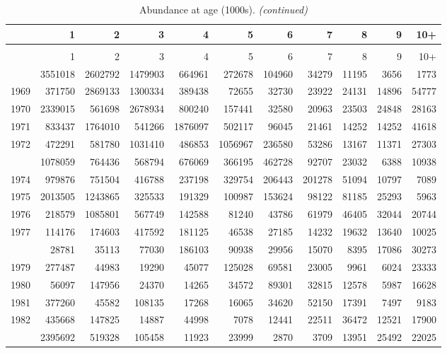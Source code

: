 \documentclass[
]{article}
\begin{document}
\begin{longtable}[t]{lrrrrrrrrrr}
\caption{\label{tab:NAA-table}Abundance at age (1000s).}\\
\toprule
  & 1 & 2 & 3 & 4 & 5 & 6 & 7 & 8 & 9 & 10+\\
\midrule
\endfirsthead
\caption[]{Abundance at age (1000s). \textit{(continued)}}\\
\toprule
  & 1 & 2 & 3 & 4 & 5 & 6 & 7 & 8 & 9 & 10+\\
\midrule
\endhead

\endfoot
\bottomrule
\endlastfoot
1968 & 3551018 & 2602792 & 1479903 & 664961 & 272678 & 104960 & 34279 & 11195 & 3656 & 1773\\
1969 & 371750 & 2869133 & 1300334 & 389438 & 72655 & 32730 & 23922 & 24131 & 14896 & 54777\\
1970 & 2339015 & 561698 & 2678934 & 800240 & 157441 & 32580 & 20963 & 23503 & 24848 & 28163\\
1971 & 833437 & 1764010 & 541266 & 1876097 & 502117 & 96045 & 21461 & 14252 & 14252 & 41618\\
1972 & 472291 & 581780 & 1031410 & 486853 & 1056967 & 236580 & 53286 & 13167 & 11371 & 27303\\
\addlinespace
1973 & 1078059 & 764436 & 568794 & 676069 & 366195 & 462728 & 92707 & 23032 & 6388 & 10938\\
1974 & 979876 & 751504 & 416788 & 237198 & 329754 & 206443 & 201278 & 51094 & 10797 & 7089\\
1975 & 2013505 & 1243865 & 325533 & 191329 & 100987 & 153624 & 98122 & 81185 & 25293 & 5963\\
1976 & 218579 & 1085801 & 567749 & 142588 & 81240 & 43786 & 61979 & 46405 & 32044 & 20744\\
1977 & 114176 & 174603 & 417592 & 181125 & 46538 & 27185 & 14232 & 19632 & 13640 & 10025\\
\addlinespace
1978 & 28781 & 35113 & 77030 & 186103 & 90938 & 29956 & 15070 & 8395 & 17086 & 30273\\
1979 & 277487 & 44983 & 19290 & 45077 & 125028 & 69581 & 23005 & 9961 & 6024 & 23333\\
1980 & 56097 & 147956 & 24370 & 14265 & 34572 & 89301 & 32815 & 12578 & 5987 & 16628\\
1981 & 377260 & 45582 & 108135 & 17268 & 16065 & 34620 & 52150 & 17391 & 7497 & 9183\\
1982 & 435668 & 147825 & 14887 & 44998 & 7078 & 12441 & 22511 & 36472 & 12521 & 17900\\
\addlinespace
1983 & 2395692 & 519328 & 105458 & 11923 & 23999 & 2870 & 3709 & 13951 & 25492 & 22025\\

\end{longtable}
\end{document}
